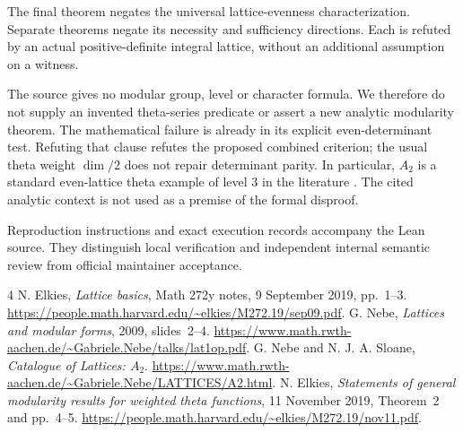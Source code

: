 \documentclass[10pt]{article}
\begin{document}
The final theorem negates the universal lattice-evenness characterization. Separate theorems negate its necessity and sufficiency directions. Each is refuted by an actual positive-definite integral lattice, without an additional assumption on a witness.

The source gives no modular group, level or character formula. We therefore do not supply an invented theta-series predicate or assert a new analytic modularity theorem. The mathematical failure is already in its explicit even-determinant test. Refuting that clause refutes the proposed combined criterion; the usual theta weight $\dim/2$ does not repair determinant parity. In particular, $A_2$ is a standard even-lattice theta example of level $3$ in the literature \cite{theta}. The cited analytic context is not used as a premise of the formal disproof.

Reproduction instructions and exact execution records accompany the Lean source. They distinguish local verification and independent internal semantic review from official maintainer acceptance.

\begin{thebibliography}{4}
 N. Elkies, \emph{Lattice basics}, Math 272y notes, 9 September 2019, pp.~1--3. \url{https://people.math.harvard.edu/~elkies/M272.19/sep09.pdf}.
 G. Nebe, \emph{Lattices and modular forms}, 2009, slides~2--4. \url{https://www.math.rwth-aachen.de/~Gabriele.Nebe/talks/lat1op.pdf}.
 G. Nebe and N. J. A. Sloane, \emph{Catalogue of Lattices: $A_2$}. \url{https://www.math.rwth-aachen.de/~Gabriele.Nebe/LATTICES/A2.html}.
 N. Elkies, \emph{Statements of general modularity results for weighted theta functions}, 11 November 2019, Theorem~2 and pp.~4--5. \url{https://people.math.harvard.edu/~elkies/M272.19/nov11.pdf}.
\end{thebibliography}
\end{document}
